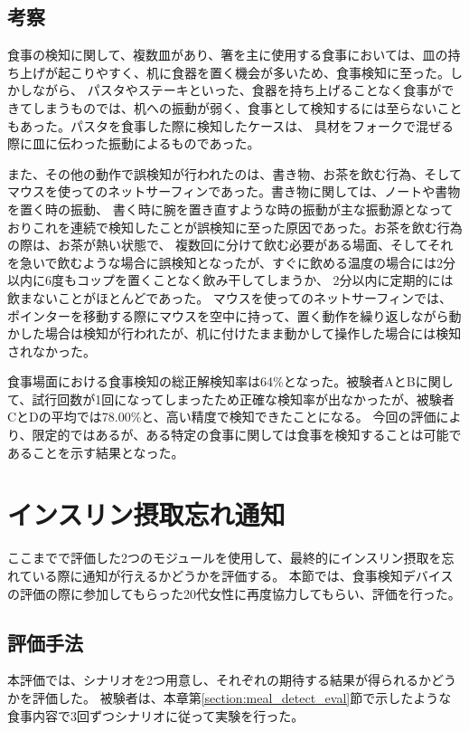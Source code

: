 \subsection{考察}

食事の検知に関して、複数皿があり、箸を主に使用する食事においては、皿の持ち上げが起こりやすく、机に食器を置く機会が多いため、食事検知に至った。しかしながら、
パスタやステーキといった、食器を持ち上げることなく食事ができてしまうものでは、机への振動が弱く、食事として検知するには至らないこともあった。パスタを食事した際に検知したケースは、
具材をフォークで混ぜる際に皿に伝わった振動によるものであった。

また、その他の動作で誤検知が行われたのは、書き物、お茶を飲む行為、そしてマウスを使ってのネットサーフィンであった。書き物に関しては、ノートや書物を置く時の振動、
書く時に腕を置き直すような時の振動が主な振動源となっておりこれを連続で検知したことが誤検知に至った原因であった。お茶を飲む行為の際は、お茶が熱い状態で、
複数回に分けて飲む必要がある場面、そしてそれを急いで飲むような場合に誤検知となったが、すぐに飲める温度の場合には2分以内に6度もコップを置くことなく飲み干してしまうか、
2分以内に定期的には飲まないことがほとんどであった。
マウスを使ってのネットサーフィンでは、ポインターを移動する際にマウスを空中に持って、置く動作を繰り返しながら動かした場合は検知が行われたが、机に付けたまま動かして操作した場合には検知されなかった。

食事場面における食事検知の総正解検知率は64\%となった。被験者AとBに関して、試行回数が1回になってしまったため正確な検知率が出なかったが、被験者CとDの平均では78.00\%と、高い精度で検知できたことになる。
今回の評価により、限定的ではあるが、ある特定の食事に関しては食事を検知することは可能であることを示す結果となった。

\section{インスリン摂取忘れ通知}
ここまでで評価した2つのモジュールを使用して、最終的にインスリン摂取を忘れている際に通知が行えるかどうかを評価する。
本節では、食事検知デバイスの評価の際に参加してもらった20代女性に再度協力してもらい、評価を行った。

\subsection{評価手法}

本評価では、シナリオを2つ用意し、それぞれの期待する結果が得られるかどうかを評価した。
被験者は、本章第\ref{section:meal_detect_eval}節で示したような食事内容で3回ずつシナリオに従って実験を行った。

